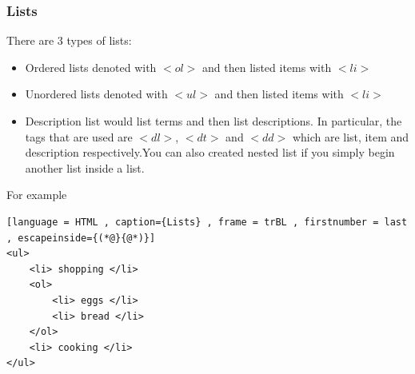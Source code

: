 \documentclass[a4paper]{article}
\theoremstyle{plain}
\theoremstyle{definition}
\theoremstyle{remark}
\begin{document}
\subsubsection{Lists}
There are 3 types of lists:
\begin{itemize}
	\item Ordered lists denoted with $<ol>$ and then listed items with $<li>$ 
	\item Unordered lists denoted with $<ul>$ and then listed items with $<li>$ 
	\item Description list would list terms and then list descriptions. In particular, the tags that are used are $<dl>$, $<dt>$ and $<dd>$ which are list, item and description respectively.You can also created nested list if you simply begin another list inside a list.
		
\end{itemize}
For example
\begin{lstlisting}[language = HTML , caption={Lists} , frame = trBL , firstnumber = last , escapeinside={(*@}{@*)}]
<ul>
	<li> shopping </li>
	<ol>
		<li> eggs </li>
		<li> bread </li>
	</ol>
	<li> cooking </li>
</ul>
\end{lstlisting}
\end{document}
